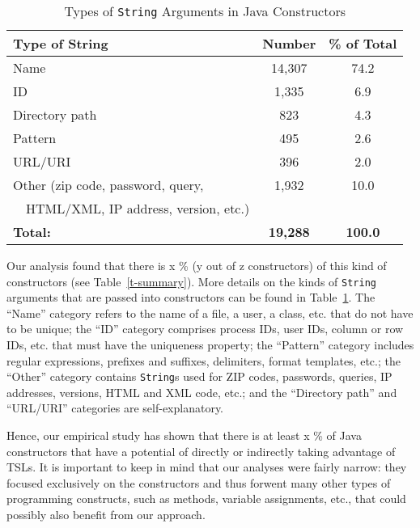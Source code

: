 \begin{table}
   \centering
    \begin{tabular}{l | c | c}
    \bf Type of String & \bf Number & \bf \% of Total \\ \hline
    Name & 14,307 & 74.2 \\
    ID	& 1,335 & 6.9 \\
    Directory path& 823 & 4.3 \\
    Pattern & 495 & 2.6 \\
    URL/URI & 396 & 2.0 \\
    Other (zip code, password, query, & 1,932 & 10.0 \\
    ~~HTML/XML, IP address, version, etc.)  & & \\ \hline
    \bf Total: & \bf 19,288 & \bf 100.0
    \end{tabular}
    \vspace{0.15in}
    \caption{Types of \lstinline{String} Arguments in Java Constructors}
    \label{t-strs-in-constrs}
\end{table}

Our analysis found that there is x \% (y out of z constructors) of this kind of constructors (see Table~\ref{t-summary}). More details on the kinds of \lstinline{String} arguments that are passed into constructors can be found in Table~\ref{t-strs-in-constrs}. The ``Name'' category refers to the name of a file, a user, a class, etc. that do not have to be unique; the ``ID'' category comprises process IDs, user IDs, column or row IDs, etc. that must have the uniqueness property; the ``Pattern'' category includes regular expressions, prefixes and suffixes, delimiters, format templates, etc.; the ``Other'' category contains \lstinline{String}s used for ZIP codes, passwords, queries, IP addresses, versions, HTML and XML code, etc.; and the ``Directory path'' and ``URL/URI'' categories are self-explanatory.

Hence, our empirical study has shown that there is at least x \% of Java constructors that have a potential of directly or indirectly taking advantage of TSLs. It is important to keep in mind that our analyses were fairly narrow: they focused exclusively on the constructors and thus forwent many other types of programming constructs, such as methods, variable assignments, etc., that could possibly also benefit from our approach.

